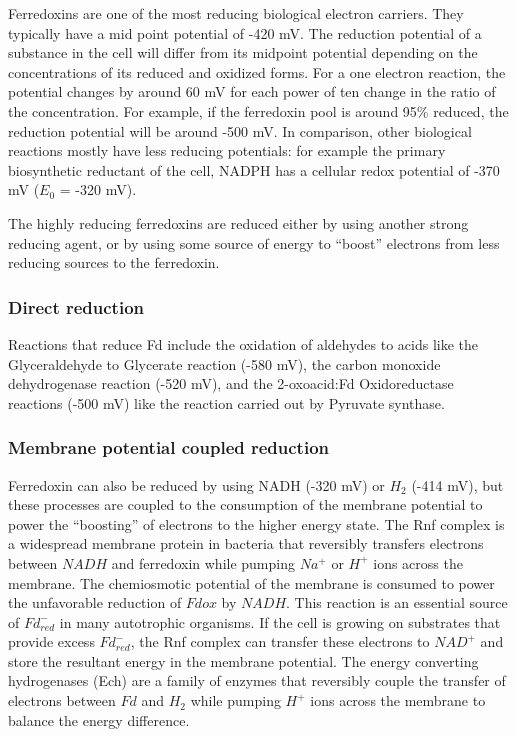 \documentclass[a4paper,14pt]{extarticle}
\begin{document}
Ferredoxins are one of the most reducing biological electron carriers. They typically have
a mid point potential of -420 mV. The reduction potential of a substance in the cell
will differ from its midpoint potential depending on the concentrations of its reduced and
oxidized forms. For a one electron reaction, the potential changes by around 60 mV for
each power of ten change in the ratio of the concentration. For example, if the ferredoxin
pool is around 95\% reduced, the reduction potential will be around -500 mV. In
comparison, other biological reactions mostly have less reducing potentials: for example
the primary biosynthetic reductant of the cell, NADPH has a cellular redox potential of
-370 mV ($E_0$ = -320 mV).

The highly reducing ferredoxins are reduced either by using another strong reducing agent,
or by using some source of energy to ``boost'' electrons from less reducing sources to the
ferredoxin.

\subsubsection{Direct reduction}
Reactions that reduce Fd include the oxidation of aldehydes to acids like the
Glyceraldehyde to Glycerate reaction (-580 mV), the carbon monoxide dehydrogenase reaction
(-520 mV), and the 2-oxoacid:Fd Oxidoreductase reactions (-500 mV) like the
reaction carried out by Pyruvate synthase.

\subsubsection{Membrane potential coupled reduction}
Ferredoxin can also be reduced by using NADH (-320 mV) or $H_2$ (-414 mV), but these
processes are coupled to the consumption of the membrane potential to power the
``boosting'' of electrons to the higher energy state. The Rnf complex is a widespread
membrane protein in bacteria that reversibly transfers electrons between $\mathit{NADH}$
and ferredoxin while pumping $Na^+$ or $H^+$ ions across the membrane. The chemiosmotic
potential of the membrane is consumed to power the unfavorable reduction of $Fd ox$ by
$\mathit{NADH}$. This reaction is an essential source of $Fd_{red}^-$ in many autotrophic
organisms. If the cell is growing on substrates that provide excess $Fd_{red}^-$, the Rnf
complex can transfer these electrons to $\mathit{NAD^+}$ and store the resultant energy in
the membrane potential. The energy converting hydrogenases (Ech) are a family of enzymes
that reversibly couple the transfer of electrons between $Fd$ and $H_2$ while pumping
$H^+$ ions across the membrane to balance the energy difference.
\end{document}
